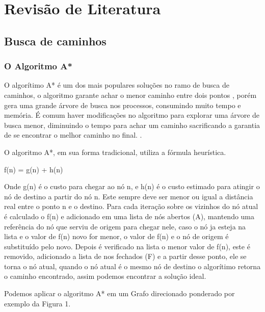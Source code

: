 \chapter[Revisão de Literatura]{Revisão de Literatura}


\section{Busca de caminhos}

\subsection{O Algoritmo A*}

O algorítimo A* é um dos mais populares soluções no ramo de busca de caminhos, o algoritmo garante achar o menor caminho entre dois pontos \cite{PEHart}, porém gera uma grande árvore de busca nos processos, consumindo muito tempo e memória. É comum haver modificações no algoritmo para explorar uma árvore de busca menor, diminuindo o tempo para achar um caminho sacrificando a garantia de se encontrar o melhor caminho no final. \cite{Botea}.

O algoritmo A*, em sua forma tradicional, utiliza a fórmula heurística.

f(n) = g(n) + h(n)

Onde g(n) é o custo para chegar ao nó n, e h(n) é o custo estimado para atingir o nó de destino a partir do nó n. Este sempre deve ser menor ou igual a distância real entre o ponto n e o destino. Para cada iteração sobre os vizinhos do nó atual é calculado o f(n) e adicionado em uma lista de nós abertos (A), mantendo uma referência do nó que serviu de origem para chegar nele, caso o nó ja esteja na lista e o valor de f(n) novo for menor, o valor de f(n) e o nó de origem é substituído pelo novo. Depois é verificado na lista o menor valor de f(n), este é removido, adicionado a lista de nos fechados (F) e a partir desse ponto, ele se torna o nó atual, quando o nó atual é o mesmo nó de destino o algorítimo retorna o caminho encontrado, assim podemos encontrar a solução ideal. \cite{PEHart}

Podemos aplicar o algoritmo A* em um Grafo direcionado ponderado por exemplo da Figura 1.


